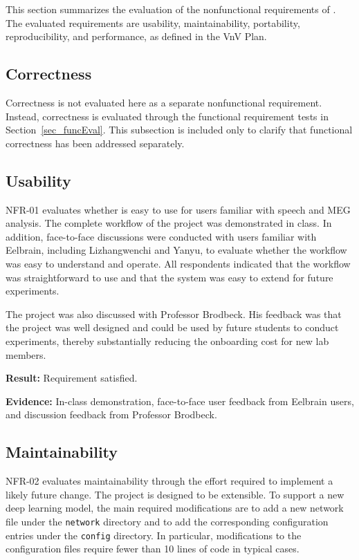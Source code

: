 \documentclass[12pt, titlepage]{article}
\begin{document}
This section summarizes the evaluation of the nonfunctional requirements of \progname.
The evaluated requirements are usability, maintainability, portability, reproducibility, and performance, as defined in the VnV Plan.

\subsection{Correctness}

Correctness is not evaluated here as a separate nonfunctional requirement.
Instead, correctness is evaluated through the functional requirement tests in Section~\ref{sec_funcEval}.
This subsection is included only to clarify that functional correctness has been addressed separately.

\subsection{Usability}

NFR-01 evaluates whether \progname{} is easy to use for users familiar with speech and MEG analysis. 
The complete workflow of the project was demonstrated in class.
In addition, face-to-face discussions were conducted with users familiar with Eelbrain, including Lizhangwenchi and Yanyu, to evaluate whether the workflow was easy to understand and operate.
All respondents indicated that the workflow was straightforward to use and that the system was easy to extend for future experiments.

The project was also discussed with Professor Brodbeck.
His feedback was that the project was well designed and could be used by future students to conduct experiments, thereby substantially reducing the onboarding cost for new lab members.

\textbf{Result:} Requirement satisfied.

\textbf{Evidence:} In-class demonstration, face-to-face user feedback from Eelbrain users, and discussion feedback from Professor Brodbeck.

\subsection{Maintainability}

NFR-02 evaluates maintainability through the effort required to implement a likely future change.
The project is designed to be extensible.
To support a new deep learning model, the main required modifications are to add a new network file under the \texttt{network} directory and to add the corresponding configuration entries under the \texttt{config} directory.
In particular, modifications to the configuration files require fewer than 10 lines of code in typical cases.
\end{document}

